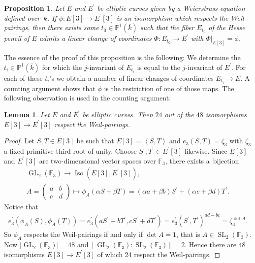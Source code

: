 \documentclass[pdftex]{sigma}
\newcommand{\mff}{{\mathbb{F}}}
\newcommand{\mpp}{{\mathbb{P}}}
\newcommand{\mseta}[1]{{\left\langle{#1}\right\rangle}}		%
\newcommand{\msetp}[1]{{\left({#1}\right)}}					%
\newcommand{\msets}[1]{{\left[{#1}\right]}}					%
\newcommand{\msetv}[1]{{\left|{#1}\right|}}					%
\newcommand{\mac}[1]{{\overline{#1}}}
\newcommand{\mgl}[2]{{\operatorname{GL}_{#1}}\msetp{#2}}		%
\newcommand{\miso}[1]{\operatorname{Iso}\msetp{#1}}			%
\newcommand{\mps}[2]{{\mpp^{#1}\msetp{#2}}}						%
\newcommand{\msl}[2]{{\operatorname{SL}_{#1}}\msetp{#2}}		%
\newcommand{\mres}[2]{{\left.{#1}\right|_{#2}}}					%
\numberwithin{equation}{section}
\newtheorem{Lemma}[Theorem]{Lemma}
\newtheorem{Proposition}[Theorem]{Proposition}
\begin{document}
\begin{Proposition}\label{hpga:prop:wprigepgl}\label{prop10} Let $E$ and $E^\prime$ be elliptic curves given by a Weierstrass equation defined over~$k$. If $\phi\colon E\msets{3}\rightarrow E^\prime\msets{3}$ is an isomorphism which respects the Weil-pairings, then there exists some $t_0\in\mps{1}{\mac {k}}$ such that the fiber $E_{t_0}$ of the Hesse pencil of $E$ admits a linear change of coordinates $\Phi\colon E_{t_0}\rightarrow E^\prime$ with $\mres{\Phi}{E\msets{3}}=\phi$.
\end{Proposition}

The essence of the proof of this proposition is the following: We determine the $t_i\in\mps{1}{\mac{k}}$ for which the $j$-invariant of $E_{t_i}$ is equal to the $j$-invariant of $E^\prime$. For each of these $t_i$'s we obtain a number of linear changes of coordinates $E_{t_i}\rightarrow E$. A counting argument shows that $\phi$ is the restriction of one of those maps. The following observation is used in the counting argument:

\begin{Lemma}\label{hpga:lem:cwpi} Let $E$ and $E^\prime$ be elliptic curves. Then $24$ out of the $48$ isomorphisms $E \msets{3}\rightarrow E^\prime\msets{3}$ respect the Weil-pairings.
\end{Lemma}
\begin{proof}Let $S,T\in E\msets{3}$ be such that $E\msets{3}=\mseta{S,T}$ and $e_3\msetp{S, T}=\zeta_3$ with $\zeta_3$ a fixed primitive third root of unity. Choose $S^\prime,T^\prime\in E^\prime\msets{3}$ likewise. Since $E\msets{3}$ and $E^\prime \msets{3}$ are two-dimensional vector spaces over $\mff_3$, there exists a~bijection
\begin{gather*}
\mgl{2}{\mff_3}\longrightarrow\miso{E\msets{3},E^\prime\msets{3}}, \\
A =\begin{pmatrix}a & b \\
c & d
\end{pmatrix}
\longmapsto \phi_A\msetp{\alpha S+\beta T} =\msetp{\alpha a+\beta b}S^\prime+\msetp{\alpha c+\beta d}T^\prime.
\end{gather*}
Notice that
\begin{gather*}
e_3^\prime\msetp{\phi_A\msetp{S},\phi_A\msetp{T}}=e_3^\prime\msetp{aS^\prime+bT^\prime,cS^\prime+dT^\prime} =e_3^\prime\msetp{S^\prime,T^\prime}^{ad-bc} =\zeta_3^{\det{A}}.
\end{gather*}
So $\phi_A$ respects the Weil-pairings if and only if $\det{A}=1$, that is $A\in \msl{2}{\mff_3}$. Now $\msetv{\mgl{2}{\mff_3}}=48$ and $\msets{\mgl{2}{\mff_3}\colon \msl{2}{\mff_3}}=2$. Hence there are 48 isomorphisms $E\msets{3}\rightarrow E^\prime\msets{3}$ of which 24 respect the Weil-pairings.
\end{proof}
\end{document}
